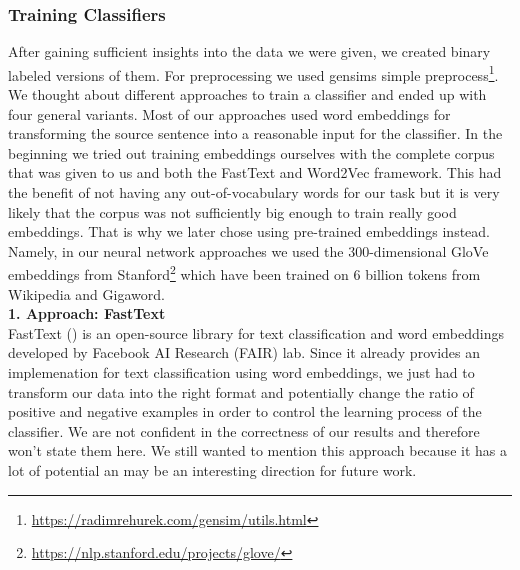 \subsubsection{Training Classifiers}
After gaining sufficient insights into the data we were given, we created binary labeled versions of them. For preprocessing we used gensims simple preprocess\footnote[2]{\url{https://radimrehurek.com/gensim/utils.html}}. We thought about different approaches to train a classifier and ended up with four general variants. Most of our approaches used word embeddings for transforming the source sentence into a reasonable input for the classifier. In the beginning we tried out training embeddings ourselves with the complete corpus that was given to us and both the FastText and Word2Vec framework. This had the benefit of not having any out-of-vocabulary words for our task but it is very likely that the corpus was not sufficiently big enough to train really good embeddings. That is why we later chose using pre-trained embeddings instead. Namely, in our neural network approaches we used the $300$-dimensional GloVe embeddings from Stanford\footnote[3]{\url{https://nlp.stanford.edu/projects/glove/}} which have been trained on 6 billion tokens from Wikipedia and Gigaword. \\

\textbf{1. Approach: FastText}\\
FastText (\cite{joulin2016bag}) is an open-source library for text classification and word embeddings developed by Facebook AI Research (FAIR) lab. Since it already provides an implemenation for text classification using word embeddings, we just had to transform our data into the right format and potentially change the ratio of positive and negative examples in order to control the learning process of the classifier. We are not confident in the correctness of our results and therefore won't state them here. We still wanted to mention this approach because it has a lot of potential an may be an interesting direction for future work.\\

